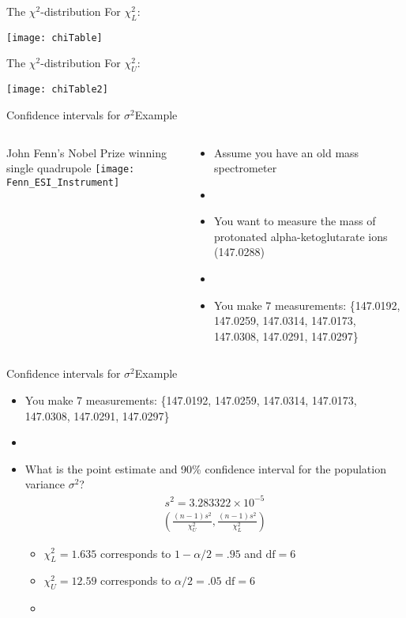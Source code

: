 \documentclass[xcolor=dvipsnames]{beamer}
\begin{document}
\begin{frame}{The  $\chi^2$-distribution}
	For $\chi^2_L$:
	\begin{center}
		\texttt{[image: chiTable]}
	\end{center}
\end{frame}

\begin{frame}{The  $\chi^2$-distribution}
	For $\chi^2_U$:
	\begin{center}
		\texttt{[image: chiTable2]}
	\end{center}
\end{frame}

\begin{frame}{Confidence intervals for $\sigma^2$}{Example}
	\begin{columns}
		\begin{column}{.5 \textwidth}
			 John Fenn's Nobel Prize winning single quadrupole
			\texttt{[image: Fenn\_ESI\_Instrument]}
		\end{column}
		\begin{column}{.5\textwidth}
			\begin{itemize}
				\item Assume you have an old mass spectrometer
				\item[]
				\item You want to measure the mass of protonated alpha-ketoglutarate ions (147.0288)
				\item[]
				\item You make 7 measurements: \{147.0192, 147.0259, 147.0314, 147.0173, 147.0308, 147.0291, 147.0297\}
			\end{itemize}
		\end{column}
	\end{columns}
\end{frame}

\begin{frame}{Confidence intervals for $\sigma^2$}{Example}
	\begin{itemize}
		\item You make 7 measurements: \{147.0192, 147.0259, 147.0314, 147.0173, 147.0308, 147.0291, 147.0297\}
		\item[]
		\item What is the point estimate and 90\% confidence interval for the population variance $\sigma^2$?
		\begin{gather*}
			s^2 = 3.283322 \times 10^{-5}
		\end{gather*}
		\begin{gather*}
			\left(\frac{(n-1) s^2}{\chi_U^2}, \frac{(n-1)s^2}{\chi_L^2} \right)
		\end{gather*}
		
		\begin{itemize}
			\item $\chi^2_L = 1.635$ corresponds to $1 - \alpha / 2 =.95$ and $\text{df} = 6$
			\item $\chi^2_U = 12.59$ corresponds to $\alpha / 2 = .05$ $\text{df} = 6$
			\item[]
		\end{itemize}
	\end{itemize}
\end{frame}
\end{document}
